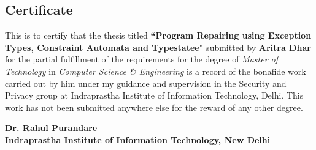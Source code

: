 
\begin{center}
\section*{Certificate}
\label{section:certificate}
\end{center}

This is to certify that the thesis titled \textbf{``Program Repairing using
Exception Types, Constraint Automata and Typestatee"} submitted by
\textbf{Aritra Dhar} for the partial fulfillment of the requirements for the
degree of \emph{Master of Technology} in \emph{Computer Science \& Engineering}
is a record of the bonafide work carried out by him under my guidance and
supervision in the Security and Privacy group at Indraprastha Institute of
Information Technology, Delhi. This work has not been submitted anywhere else
for the reward of any other degree. \\ \vspace{0.5in}

\textbf{Dr. Rahul Purandare}\\
\textbf{Indraprastha Institute of Information Technology, New Delhi}
